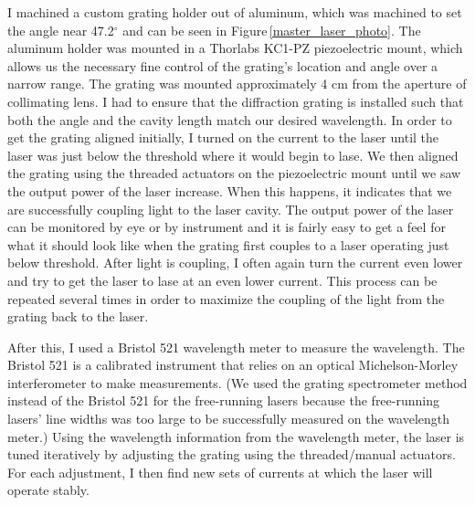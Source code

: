  I machined a custom grating holder out of aluminum, which was machined to set the angle near 47.2$^{\circ}$ and can be seen in Figure\,\ref{master_laser_photo}. The aluminum holder was mounted in a Thorlabs KC1-PZ piezoelectric mount, which allows us the necessary fine control of the grating's location and angle over a narrow range.  The grating was mounted approximately 4 cm from the aperture of collimating lens.
I had to ensure that the diffraction grating is installed such that both the angle and the cavity length match our desired wavelength. In order to get the grating aligned initially, I turned on the current to the laser until the laser was just below the threshold where it would begin to lase. We then aligned the grating using the threaded actuators on the piezoelectric mount until we saw the output power of the laser increase. When this happens, it indicates that we are successfully coupling light to the laser cavity. The output power of the laser can be monitored by eye or by instrument and it is fairly easy to get a feel for what it should look like when the grating first couples to a laser operating just below threshold. After light is coupling, I often again turn the current even lower and try to get the laser to lase at an even lower current. This process can be repeated several times in order to maximize the coupling of the light from the grating back to the laser.

After this, I used a Bristol 521 wavelength meter to measure the wavelength. The Bristol 521 is a calibrated instrument that relies on an optical Michelson-Morley interferometer to make measurements. (We used the grating spectrometer method instead of the Bristol 521 for the free-running lasers because the free-running lasers' line widths was too large to be successfully measured on the wavelength meter.) Using the wavelength information from the wavelength meter, the laser is tuned iteratively by adjusting the grating using the threaded/manual actuators. For each adjustment, I then find new sets of currents at which the laser will operate stably. 

